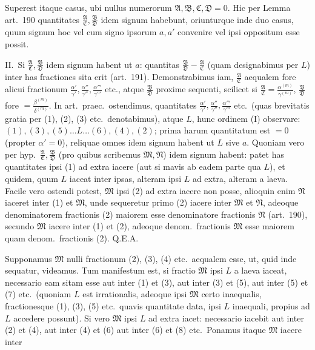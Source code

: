 \documentclass[12pt,a4paper]{article}
\theoremstyle{plain}
\theoremstyle{definition}
\theoremstyle{remark}
\newcommand{\qeoa}{\textsc{Q.E.A.}}
\begin{document}
Superest itaque casus, ubi nullus numerorum $\mathfrak{A},\mathfrak{B},\mathfrak{C},\mathfrak{D}=0$. Hic per Lemma art.\ 190 quantitates $\frac{\mathfrak{A}}{\mathfrak{C}},\frac{\mathfrak{B}}{\mathfrak{D}}$ idem signum habebunt, oriunturque inde duo casus, quum signum hoc vel cum signo ipsorum $a,a'$ convenire vel ipsi oppositum esse possit.

II.\ Si $\frac{\mathfrak{A}}{\mathfrak{C}},\frac{\mathfrak{B}}{\mathfrak{D}}$ idem signum habent ut $a$: quantitas $\frac{\mathfrak{B}}{\mathfrak{D}}-\frac{\mathfrak{A}}{\mathfrak{C}}$ (quam designabimus per $L$) inter has fractiones sita erit (art.\ 191). Demonstrabimus iam, $\frac{\mathfrak{A}}{\mathfrak{C}}$ aequalem fore alicui fractionum $\frac{\alpha'}{\gamma'},\frac{\alpha''}{\gamma''},\frac{\alpha'''}{\gamma'''}$ etc., atque $\frac{\mathfrak{B}}{\mathfrak{D}}$ proxime sequenti, scilicet si $\frac{\mathfrak{A}}{\mathfrak{C}}=\frac{\alpha^{(m)}}{\gamma^{(m)}}$, $\frac{\mathfrak{B}}{\mathfrak{D}}$ fore $=\frac{\beta^{(m)}}{\delta^{(m)}}$. In art.\ praec.\ ostendimus, quantitates $\frac{\alpha'}{\gamma'},\frac{\alpha''}{\gamma''},\frac{\alpha'''}{\gamma'''}$ etc.\ (quas brevitatis gratia per (1), (2), (3) etc.\ denotabimus), atque $L$, hunc ordinem (I) observare: $(1),(3),(5)\ldots L\ldots (6),(4),(2)$; prima harum quantitatum est $=0$ (propter $\alpha'=0$), reliquae omnes idem signum habent ut $L$ sive $a$. Quoniam vero per hyp.\ $\frac{\mathfrak{A}}{\mathfrak{C}},\frac{\mathfrak{B}}{\mathfrak{D}}$ (pro quibus scribemus $\mathfrak{M},\mathfrak{N}$) idem signum habent: patet has quantitates ipsi (1) ad extra iacere (aut si mavis ab eadem parte qua $L$), et quidem, quum $L$ iaceat inter ipsas, alteram ipsi $L$ ad extra, alteram a laeva. Facile vero ostendi potest, $\mathfrak{M}$ ipsi (2) ad extra iacere non posse, alioquin enim $\mathfrak{N}$ iaceret inter (1) et $\mathfrak{M}$, unde sequeretur primo (2) iacere inter $\mathfrak{M}$ et $\mathfrak{N}$, adeoque denominatorem fractionis (2) maiorem esse denominatore fractionis $\mathfrak{N}$ (art.\ 190), secundo $\mathfrak{M}$ iacere inter (1) et (2), adeoque denom.\ fractionis $\mathfrak{M}$ esse maiorem quam denom.\ fractionis (2). \qeoa

Supponamus $\mathfrak{M}$ nulli fractionum (2), (3), (4) etc.\ aequalem esse, ut, quid inde sequatur, videamus. Tum manifestum est, si fractio $\mathfrak{M}$ ipsi $L$ a laeva iaceat, necessario eam sitam esse aut inter (1) et (3), aut inter (3) et (5), aut inter (5) et (7) etc.\ (quoniam $L$ est irrationalis, adeoque ipsi $\mathfrak{M}$ certo inaequalis, fractionesque (1), (3), (5) etc.\ quavis quantitate data, ipsi $L$ inaequali, propius ad $L$ accedere possunt). Si vero $\mathfrak{M}$ ipsi $L$ ad extra iacet: necessario iacebit aut inter (2) et (4), aut inter (4) et (6) aut inter (6) et (8) etc.\ Ponamus itaque $\mathfrak{M}$ iacere inter
\end{document}
